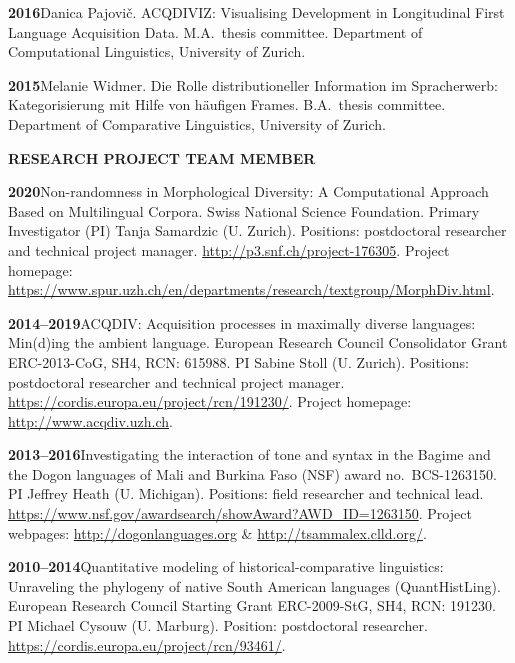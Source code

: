 \documentclass[11pt]{article}
\newcommand{\hangpara}{
 \setlength{\parindent}{0in} %
 \hangindent=0.42in %
}
\begin{document}
\hangpara
\vskip 6pt
{\bf 2016}\hspace{1ex}Danica Pajovi{\v c}. ACQDIVIZ: Visualising Development in Longitudinal First Language Acquisition Data. M.A.\ thesis committee. Department of Computational Linguistics, University of Zurich.

\vskip 6pt
\hangpara
{\bf 2015}\hspace{1ex}Melanie Widmer. Die Rolle distributioneller Information im Spracherwerb: Kategorisierung mit Hilfe von h{\"a}ufigen Frames. B.A.\ thesis committee. Department of Comparative Linguistics, University of Zurich.


\vskip 20pt
\begin{flushleft}
{\bf RESEARCH PROJECT TEAM MEMBER}
\end{flushleft}

\hangpara
{\bf 2020}\hspace{1ex}Non-randomness in Morphological Diversity: A Computational Approach Based on Multilingual Corpora. Swiss National Science Foundation. Primary Investigator (PI) Tanja Samardzic (U. Zurich). Positions: postdoctoral researcher and technical project manager. \url{http://p3.snf.ch/project-176305}. Project homepage: \url{https://www.spur.uzh.ch/en/departments/research/textgroup/MorphDiv.html}.

\vskip 6pt
\hangpara
{\bf 2014--2019}\hspace{1ex}ACQDIV: Acquisition processes in maximally diverse languages: Min(d)ing the ambient language. European Research Council Consolidator Grant ERC-2013-CoG, SH4, RCN: 615988. PI Sabine Stoll (U. Zurich). Positions: postdoctoral researcher and technical project manager. \url{https://cordis.europa.eu/project/rcn/191230/}. Project homepage: \url{http://www.acqdiv.uzh.ch}. %

\vskip 6pt
\hangpara
{\bf 2013--2016}\hspace{1ex}Investigating the interaction of tone and syntax in the Bagime and the Dogon languages of Mali and Burkina Faso (NSF) award no.\ BCS-1263150. PI Jeffrey Heath (U. Michigan). Positions: field researcher and technical lead. \url{https://www.nsf.gov/awardsearch/showAward?AWD_ID=1263150}. Project webpages: \url{http://dogonlanguages.org} \& \url{http://tsammalex.clld.org/}.

\vskip 6pt
\hangpara
{\bf 2010--2014}\hspace{1ex}Quantitative modeling of historical-comparative linguistics: Unraveling the phylogeny of native South American languages (QuantHistLing). European Research Council Starting Grant ERC-2009-StG, SH4, RCN: 191230. PI Michael Cysouw (U. Marburg). Position: postdoctoral researcher. \url{https://cordis.europa.eu/project/rcn/93461/}.
\end{document}
